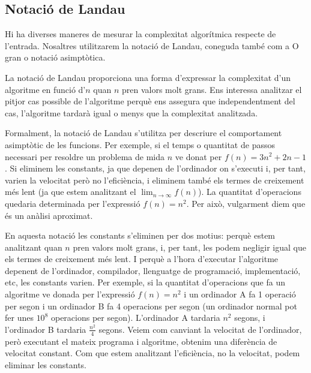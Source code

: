 \subsection{Notació de Landau}
Hi ha diverses maneres de mesurar la complexitat algorítmica respecte de l'entrada. Nosaltres utilitzarem la notació de Landau, coneguda també com a O gran o notació asimptòtica.

La notació de Landau proporciona una forma  d'expressar la complexitat d'un algoritme en funció d'$n$ quan $n$ pren valors molt grans. Ens interessa analitzar el pitjor cas possible de l'algoritme perquè ens assegura que independentment del cas, l'algoritme tardarà igual o menys que la complexitat analitzada.

Formalment, la notació de Landau s'utilitza per descriure el comportament asimptòtic de les funcions. Per exemple, si el temps o quantitat de passos necessari per resoldre un problema de mida $n$ ve donat per $f(n) = 3n^2 + 2n -1$. Si eliminem les constants, ja que depenen de l'ordinador on s'executi i, per tant, varien la velocitat però no l'eficiència, i eliminem també els termes de creixement més lent (ja que estem analitzant el $\lim_{n \to \infty} f(n)$). La quantitat d'operacions quedaria determinada per l'expressió $f(n) = n^2$. Per això, vulgarment diem que és un anàlisi aproximat.

En aquesta notació les constants s'eliminen per dos motius: perquè estem analitzant quan $n$ pren valors molt grans, i, per tant, les podem negligir igual que els termes de creixement més lent. I perquè a l'hora d'executar l'algoritme depenent de l'ordinador, compilador, llenguatge de programació, implementació, etc, les constants varien. Per exemple, si la quantitat d'operacions que fa un algoritme ve donada per l'expressió $f(n) = n^2$ i un ordinador A fa 1 operació per segon i un ordinador B fa 4 operacions per segon (un ordinador normal pot fer unes $10^8$ operacions per segon). L'ordinador A tardaria $n^2$ segons, i l'ordinador B tardaria $\frac{n^2}{4}$ segons. Veiem com canviant la velocitat de l'ordinador, però executant el mateix programa i algoritme, obtenim una diferència de velocitat constant. Com que estem analitzant l'eficiència, no la velocitat, podem eliminar les constants.


